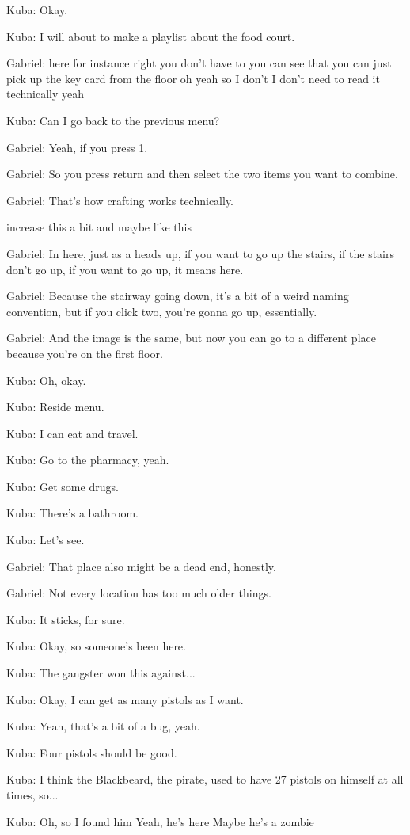 Kuba: Okay.

Kuba: I will about to make a playlist about the food court.

Gabriel: here for instance right you don't have to you can see that you can just pick up the key card from the floor oh yeah so I don't I don't need to read it technically yeah

Kuba: Can I go back to the previous menu?

Gabriel: Yeah, if you press 1.

Gabriel: So you press return and then select the two items you want to combine.

Gabriel: That's how crafting works technically.

increase this a bit and maybe like this

Gabriel: In here, just as a heads up, if you want to go up the stairs, if the stairs don't go up, if you want to go up, it means here.

Gabriel: Because the stairway going down, it's a bit of a weird naming convention, but if you click two, you're gonna go up, essentially.

Gabriel: And the image is the same, but now you can go to a different place because you're on the first floor.

Kuba: Oh, okay.

Kuba: Reside menu.

Kuba: I can eat and travel.

Kuba: Go to the pharmacy, yeah.

Kuba: Get some drugs.

Kuba: There's a bathroom.

Kuba: Let's see.

Gabriel: That place also might be a dead end, honestly.

Gabriel: Not every location has too much older things.

Kuba: It sticks, for sure.

Kuba: Okay, so someone's been here.

Kuba: The gangster won this against...

Kuba: Okay, I can get as many pistols as I want.

Kuba: Yeah, that's a bit of a bug, yeah.

Kuba: Four pistols should be good.

Kuba: I think the Blackbeard, the pirate, used to have 27 pistols on himself at all times, so...

Kuba: Oh, so I found him Yeah, he's here Maybe he's a zombie


